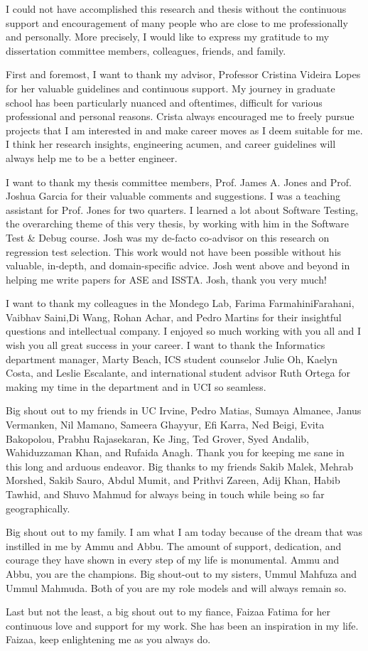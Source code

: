 \acknowledgments
{
I could not have accomplished this research and thesis without the continuous support and encouragement of many people who are close to me professionally and personally. More precisely, I would like to express my gratitude to my dissertation committee members, colleagues, friends, and family. 

First and foremost, I want to thank my advisor, Professor Cristina Videira Lopes for her valuable guidelines and continuous support. My journey in graduate school has been particularly nuanced and oftentimes, difficult for various professional and personal reasons. Crista always encouraged me to freely pursue projects that I am interested in and make career moves as I deem suitable for me. I think her research insights, engineering acumen, and career guidelines will always help me to be a better engineer. 

I want to thank my thesis committee members, Prof. James A. Jones and Prof. Joshua Garcia for their valuable comments and suggestions. I was a teaching assistant for Prof. Jones for two quarters. I learned a lot about Software Testing, the overarching theme of this very thesis, by working with him in the Software Test & Debug course. Josh was my de-facto co-advisor on this research on regression test selection. This work would not have been possible without his valuable, in-depth, and domain-specific advice. Josh went above and beyond in helping me write papers for ASE and ISSTA. Josh, thank you very much! 

I want to thank my colleagues in the Mondego Lab, ‪Farima FarmahiniFarahani, Vaibhav Saini,Di Wang, Rohan Achar, and Pedro Martins for their insightful questions and intellectual company. I enjoyed so much working with you all and I wish you all great success in your career.  I want to thank the Informatics department manager, Marty Beach, ICS student counselor Julie Oh, Kaelyn Costa, and Leslie Escalante, and international student advisor Ruth Ortega for making my time in the department and in UCI so seamless. 

Big shout out to my friends in UC Irvine, Pedro Matias, Sumaya Almanee, Janus Vermanken, Nil Mamano, Sameera Ghayyur, Efi Karra, Ned Beigi, Evita Bakopolou, Prabhu Rajasekaran, Ke Jing, Ted Grover, Syed Andalib, Wahiduzzaman Khan, and Rufaida Anagh. Thank you for keeping me sane in this long and arduous endeavor. Big thanks to my friends Sakib Malek, Mehrab Morshed, Sakib Sauro, Abdul Mumit, and Prithvi Zareen, Adij  Khan, Habib Tawhid, and Shuvo Mahmud for always being in touch while being so far geographically.  

Big shout out to my family. I am what I am today because of the dream that was instilled in me by Ammu and Abbu. The amount of support, dedication, and courage they have shown in every step of my life is monumental. Ammu and Abbu, you are the champions. Big shout-out to my sisters, Ummul Mahfuza and Ummul Mahmuda. Both of you are my role models and will always remain so.  

Last but not the least, a big shout out to my fiance, Faizaa Fatima for her continuous love and support for my work. She has been an inspiration in my life. Faizaa, keep enlightening me as you always do. 
}



